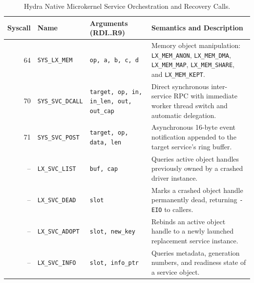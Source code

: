 \begin{table}[htbp]
\centering
\small
\begin{tabularx}{\textwidth}{rllX}
\toprule
\textbf{Syscall} & \textbf{Name} & \textbf{Arguments (RDI..R9)} & \textbf{Semantics and Description} \\
\midrule
64 & \texttt{SYS\_LX\_MEM} & \texttt{op, a, b, c, d} & Memory object manipulation: \texttt{LX\_MEM\_ANON}, \texttt{LX\_MEM\_DMA}, \texttt{LX\_MEM\_MAP}, \texttt{LX\_MEM\_SHARE}, and \texttt{LX\_MEM\_KEPT}. \\
70 & \texttt{SYS\_SVC\_DCALL} & \texttt{target, op, in, in\_len, out, out\_cap} & Direct synchronous inter-service RPC with immediate worker thread switch and automatic delegation. \\
71 & \texttt{SYS\_SVC\_POST} & \texttt{target, op, data, len} & Asynchronous 16-byte event notification appended to the target service's ring buffer. \\
\midrule
-- & \texttt{LX\_SVC\_LIST} & \texttt{buf, cap} & Queries active object handles previously owned by a crashed driver instance. \\
-- & \texttt{LX\_SVC\_DEAD} & \texttt{slot} & Marks a crashed object handle permanently dead, returning \texttt{-EIO} to callers. \\
-- & \texttt{LX\_SVC\_ADOPT} & \texttt{slot, new\_key} & Rebinds an active object handle to a newly launched replacement service instance. \\
-- & \texttt{LX\_SVC\_INFO} & \texttt{slot, info\_ptr} & Queries metadata, generation numbers, and readiness state of a service object. \\
\bottomrule
\end{tabularx}
\caption{Hydra Native Microkernel Service Orchestration and Recovery Calls.}
\label{tab:syscall_native}
\end{table}
